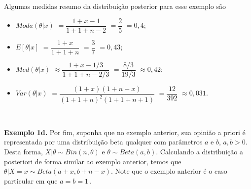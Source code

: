 \documentclass[
]{book}
\begin{document}
Algumas medidas resumo da distribuição posterior para esse exemplo são

\begin{itemize}
\item
  \(Moda(\theta|x)\) \(=\dfrac{1+x-1}{1+1+n-2}\) \(=\dfrac{2}{5}\) \(=0,4\);
\item
  \(E[\theta|x]\) \(=\dfrac{1+x}{1+1+n}\) \(=\dfrac{3}{7}\) \(=0,43\);
\item
  \(Med(\theta|x)\) \(\approx \dfrac{1+x-1/3}{1+1+n-2/3}\) \(=\dfrac{8/3}{19/3}\) \(\approx 0,42\);
\item
  \(Var(\theta|x)\) \(=\dfrac{(1+x)(1+n-x)}{(1+1+n)^2(1+1+n+1)}\) \(=\dfrac{12}{392}\) \(\approx 0,031\).
\end{itemize}

\(~\)

\textbf{Exemplo 1d.} Por fim, suponha que no exemplo anterior, sua opinião a priori é representada por uma distribuição beta qualquer com parâmetros \(a\) e \(b\), \(a,b > 0\). Desta forma, \(X|\theta \sim Bin(n,\theta)\) e \(\theta\sim Beta(a,b)\). Calculando a distribuição a posteriori de forma similar ao exemplo anterior, temos que \(\theta|X=x \sim Beta(a+x,b+n-x)\). Note que o exemplo anterior é o caso particular em que \(a=b=1~.\)

\(~\)
\end{document}
